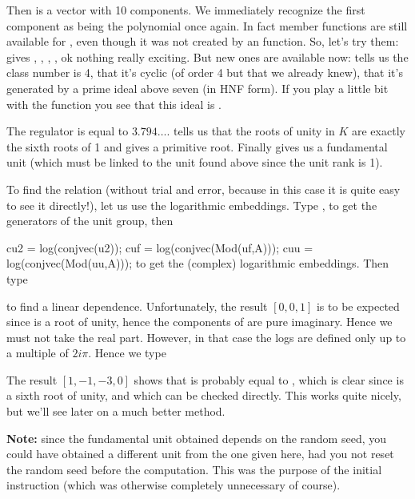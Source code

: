 Then  is a vector with 10 components. We immediately recognize the first
component as being the polynomial  once again. In fact member
functions are still available for , even though it was not created
by an  function. So, let's try them:  gives ,
, , , ok nothing really exciting. But new
ones are available now:  tells us the class number is 4,
 that it's cyclic (of order 4 but that we already knew),
 that it's generated by a prime ideal above seven (in HNF form). If
you play a little bit with the  function you see that this ideal
is .

 The regulator  is equal to $3.794\dots$.  tells us that
the roots of unity in $K$ are exactly the sixth roots of 1 and gives a
primitive root. Finally  gives us a fundamental unit (which must be
linked to the unit  found above since the unit rank is 1).

To find the relation (without trial and error, because in this case it is
quite easy to see it directly!), let us use the logarithmic embeddings. Type
,  to get the generators of the unit
group, then

\bprog
cu2 = log(conjvec(u2));
cuf = log(conjvec(Mod(uf,A)));
cuu = log(conjvec(Mod(uu,A)));
\eprog\noindent
to get the (complex) logarithmic embeddings. Then type


\noindent to find a linear dependence. Unfortunately, the result $[0,0,1]$ is
to be expected since  is a root of unity, hence the components of
 are pure imaginary. Hence we must not take the real part. However,
in that case the logs are defined only up to a multiple of $2i\pi$. Hence we
type


The result $[1,-1,-3,0]$ shows that  is probably equal to
, which is clear since  is a sixth root of unity,
and which can be checked directly. This works quite nicely, but we'll see
later on a much better method.

{\bf Note:} since the fundamental unit obtained depends on the random
seed, you could have obtained a different unit from the one given here, had
you not reset the random seed before the computation. This was the purpose
of the initial  instruction (which was otherwise completely
unnecessary of course). \medskip

